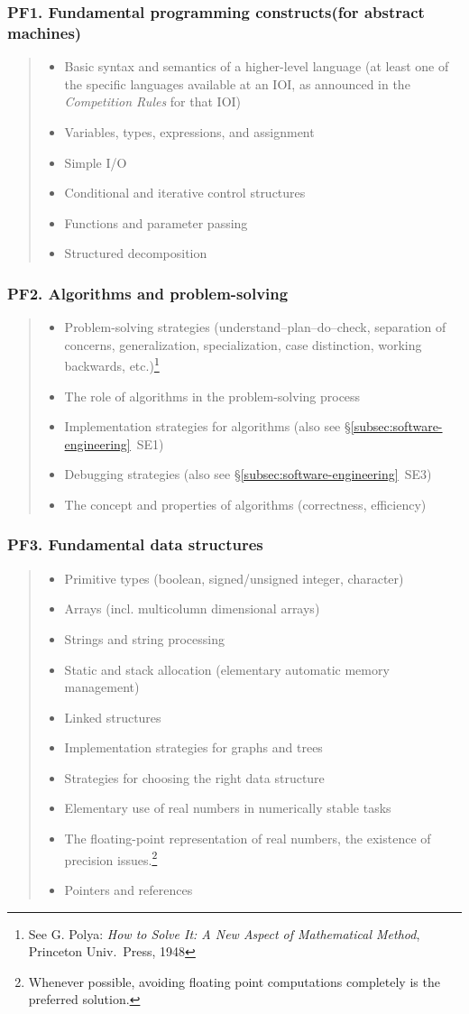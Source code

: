 \documentclass[a4paper,11pt,oneside]{article}
\newcommand{\cmark}{\ding{51}}%
\newcommand{\CC}[1]{#1}
\newcommand{\Cincluded}{{\small\cmark}}
\newcommand{\Cdefine}{{\small\cmark\faFileTextO}}
\newcommand{\Ccodeonly}{{\small\cmark\faFileText}}
\newcommand{\Iincluded}{\item[\hbox to 1.8em{\Cincluded\hfill}]}
\newcommand{\Idefine}{\item[\hbox to 1.8em{\Cdefine\hfill}]}
\newcommand{\Icodeonly}{\item[\hbox to 1.8em{\Ccodeonly\hfill}]}
\newenvironment{myitemize}{\begin{quote}\begin{itemize}\itemsep 0pt}{\end{itemize}\end{quote}}
\begin{document}
    \subsubsection*{PF1. Fundamental programming constructs\rm (for abstract machines)}

    \begin{myitemize}
    \Iincluded\CC{Basic syntax and semantics of a higher-level language} (at least one of the specific languages available at an IOI, as announced in the \emph{Competition Rules\/} for that IOI)
    \Iincluded\CC{Variables, types, expressions, and assignment}
    \Iincluded\CC{Simple I/O}
    \Iincluded\CC{Conditional and iterative control structures}
    \Iincluded\CC{Functions and parameter passing}
    \Icodeonly\CC{Structured decomposition}
    \end{myitemize}

    \subsubsection*{PF2. Algorithms and problem-solving}

    \begin{myitemize}
    \Icodeonly\CC{Problem-solving strategies} (understand--plan--do--check,
        separation of concerns, generalization, specialization, case distinction, working backwards,
        etc.)\footnote{See G. Polya: \emph{How to Solve It: A New Aspect of Mathematical Method},
        Princeton Univ.\ Press, 1948}
    \Icodeonly\CC{The role of algorithms in the problem-solving process}
    \Icodeonly\CC{Implementation strategies for algorithms} (also see \S\ref{subsec:software-engineering}~SE1)
    \Icodeonly\CC{Debugging strategies} (also see \S\ref{subsec:software-engineering}~SE3)
    \Idefine\CC{The concept and properties of algorithms} (correctness, efficiency)
    \end{myitemize}

    \subsubsection*{PF3. Fundamental data structures}

    \begin{myitemize}
    \Iincluded\CC{Primitive types} (boolean, signed/unsigned integer, character)
    \Iincluded\CC{Arrays} (incl. multicolumn dimensional arrays)
    \Iincluded\CC{Strings and string processing}
    \Idefine\CC{Static and stack allocation} (elementary automatic memory management)
    \Idefine\CC{Linked structures} 
    \Idefine\CC{Implementation strategies for graphs and trees}
    \Idefine\CC{Strategies for choosing the right data structure}
    \Icodeonly\CC{Elementary use of real numbers in numerically stable tasks}
    \Icodeonly The floating-point representation of real numbers, the existence of precision issues.\footnote{Whenever possible, avoiding floating point computations completely is the preferred solution.}
    \Icodeonly \CC{Pointers and references}
    \end{myitemize}
\end{document}
